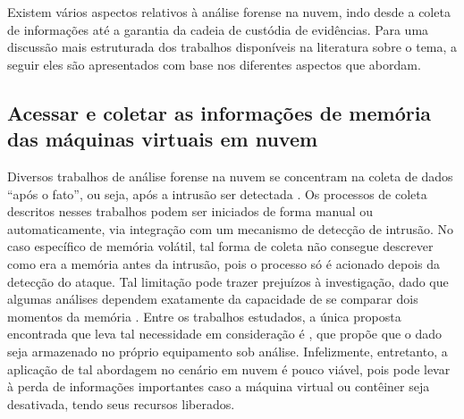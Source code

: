 \documentclass[conference]{IEEEtran}
\begin{document}
Existem vários aspectos relativos à análise forense na nuvem, indo desde a coleta de informações até a garantia da cadeia de custódia de evidências.
%
Para uma discussão mais estruturada dos trabalhos disponíveis na literatura sobre o tema, a seguir eles são apresentados com base nos diferentes aspectos que abordam.

\subsection{Acessar e coletar as informações de memória das máquinas virtuais em nuvem}

Diversos trabalhos de análise forense na nuvem se concentram na coleta de dados ``após o fato'', ou seja, após a intrusão ser detectada \cite{Reichert_Auto_acquisition:2015,Poisel_VMI:2013,Dykstra_FROST:2013,George_DF2CE:2012,Sang_Log_approach:2013}. 
%
Os processos de coleta descritos nesses trabalhos podem ser iniciados de forma manual ou automaticamente, via integração com um mecanismo de detecção de intrusão. 
%
No caso específico de memória volátil, tal forma de coleta não consegue descrever como era a memória antes da intrusão, pois o processo só é acionado depois da detecção do ataque. 
%
Tal limitação pode trazer prejuízos à investigação, dado que algumas análises dependem exatamente da capacidade de se comparar dois momentos da memória \cite{Case_Memory_Forensics:2014}. 
%
Entre os trabalhos estudados, a única proposta encontrada que leva tal necessidade em consideração é \cite{Dezfouli_Backup_approach:2012}, que propõe que o dado seja armazenado no próprio equipamento sob análise.
%
Infelizmente, entretanto, a aplicação de tal abordagem no cenário em nuvem é pouco viável, pois pode levar à perda de informações importantes caso a máquina virtual ou contêiner seja desativada, tendo seus recursos liberados.
%
\end{document}
